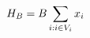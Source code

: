\documentclass[preview]{standalone}
\begin{document}
\begin{align*}
\special{dvisvgm:raw <g id='unique000'>}H_B = B\sum_{i:i \in V_i} x_i\special{dvisvgm:raw </g>}
\end{align*}
\end{document}
